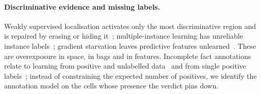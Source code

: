\paragraph{Discriminative evidence and missing labels.} Weakly supervised localisation activates only the most discriminative region and is repaired by erasing or hiding it~\cite{zhou2016cam,wei2017erasing,singh2017hide}; multiple-instance learning has unreliable instance labels~\cite{ilse2018attention}; gradient starvation leaves predictive features unlearned~\cite{pezeshki2021gradient}. These are overexposure in space, in bags and in features. Incomplete fact annotations relate to learning from positive and unlabelled data~\cite{elkan2008pu} and from single positive labels~\cite{cole2021single}; instead of constraining the expected number of positives, we identify the annotation model on the cells whose presence the verdict pins down.
